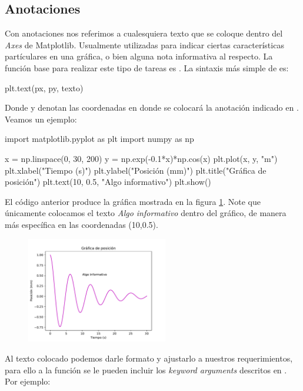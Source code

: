 \subsection{Anotaciones}

Con anotaciones nos referimos a cualesquiera texto que se coloque dentro del \textit{Axes} de Matplotlib. Usualmente 
utilizadas para indicar ciertas características partículares en una gráfica, o bien alguna nota informativa al respecto.
La función base para realizar este tipo de tareas es . La sintaxis más simple de  es:

\begin{python}
plt.text(px, py, texto)
\end{python}

Donde  y  denotan las coordenadas en donde se colocará la anotación indicado en . 
Veamos un ejemplo:

\begin{python}
import matplotlib.pyplot as plt
import numpy as np

x = np.linspace(0, 30, 200)
y = np.exp(-0.1*x)*np.cos(x)
plt.plot(x, y, "m")
plt.xlabel("Tiempo (s)")
plt.ylabel("Posición (mm)")
plt.title("Gráfica de posición")
plt.text(10, 0.5, "Algo informativo")
plt.show()
\end{python}

El código anterior produce la gráfica mostrada en la figura \ref{fig:plot_text}. Note que únicamente colocamos 
el texto \textit{Algo informativo}  dentro del gráfico, de manera más específica en las coordenadas (10,0.5).

\begin{figure}[H]
	\centering
	\includegraphics[width=0.55\textwidth]{img/ch03/plot_text.pdf}
	\caption{}
	\label{fig:plot_text}
\end{figure}

Al texto colocado podemos darle formato y ajustarlo a nuestros requerimientos, para ello a la función 
 se le pueden incluir los \textit{keyword arguments} descritos en . 
Por ejemplo:

